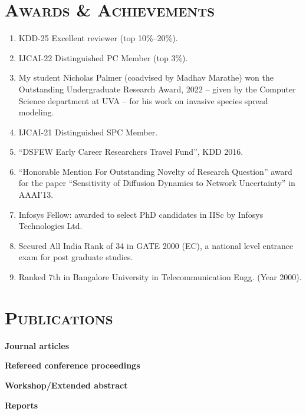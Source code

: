 \documentclass[margin,10pt]{res} %
\begin{document}
\begin{resume}
\section{\textnormal{\textsc{Awards \& Achievements}}}
\begin{enumerate}[$\circ$]
    \item KDD-25 Excellent reviewer (top 10\%--20\%).
    \item IJCAI-22 Distinguished PC Member (top 3\%).
\item My student Nicholas Palmer (coadvised by Madhav Marathe) won the
Outstanding Undergraduate Research Award, 2022 -- given by the Computer
Science department at UVA -- for his work on invasive species spread
modeling.
    \item IJCAI-21 Distinguished SPC Member.
   \item ``DSFEW Early Career Researchers Travel Fund'', KDD 2016.
\item ``Honorable Mention For Outstanding Novelty of Research
Question'' award for the paper ``Sensitivity of Diffusion Dynamics to
Network Uncertainty'' in AAAI'13.
\item Infosys Fellow: awarded to select
PhD candidates in IISc by Infosys Technologies Ltd. 
\item Secured All India Rank of 34 in GATE 2000 (EC), a national level
entrance exam for post graduate studies.
\item Ranked 7th in Bangalore University in Telecommunication Engg. (Year 2000).
\end{enumerate}

\section{\textnormal{\textsc{Publications}}} 
\noindent\textbf{Journal articles}\\
\begin{etaremune}

\end{etaremune}
\noindent\textbf{Refereed conference proceedings}\\
\begin{etaremune}

\end{etaremune}
\noindent\textbf{Workshop/Extended abstract}\\
\begin{etaremune}

\end{etaremune}
\noindent\textbf{Reports}\\
\begin{etaremune}

\end{etaremune}

\end{resume}
\end{document}
